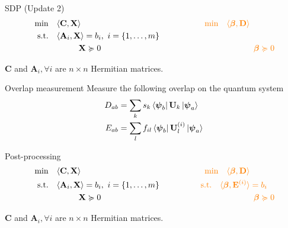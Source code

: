 \documentclass{beamer}
\newcommand{\betamat}{\boldsymbol\beta}
\newcommand{\psivec}{\boldsymbol\psi}
\newcommand{\Amat}{\mathbf{A}}
\newcommand{\Cmat}{\mathbf{C}}
\newcommand{\Dmat}{\mathbf{D}}
\newcommand{\Emat}{\mathbf{E}}
\newcommand{\Umat}{\mathbf{U}}
\newcommand{\Xmat}{\mathbf{X}}
\newcommand{\st}{\mathrm{s.t.}}
\begin{document}
	\begin{frame}{SDP (Update 2)}
		\begin{equation}
			\begin{aligned}
				& \min \quad \langle \Cmat, \Xmat \rangle \hspace{150pt} \textcolor{orange}{\min \quad \langle \betamat, \Dmat \rangle} \nonumber \\
				& \hspace{5pt} \st \quad \langle \Amat_i, \Xmat \rangle = b_i,\ i = \{1, \dots, m\} \nonumber \\
				& \hspace{55pt} \Xmat \succcurlyeq 0 \hspace{185pt} \textcolor{orange}{\betamat \succcurlyeq 0} \nonumber
			\end{aligned}
		\end{equation}
		\vfill
		\begin{center}
			$\Cmat$ and $\Amat_i, \forall i$ are $n \times n$ Hermitian matrices.
		\end{center}
	\end{frame}
	
	\begin{frame}{Overlap measurement}
		Measure the following overlap on the quantum system
		\begin{align*}
			D_{ab} &= \sum_k s_k \bra{\psivec_b} \Umat_k \ket{\psivec_a} \\
			E_{ab} &= \sum_l f_{il} \bra{\psivec_b} \Umat_l^{(i)} \ket{\psivec_a}
		\end{align*}
	\end{frame}
	
	\begin{frame}{Post-processing}
		\begin{equation}
			\begin{aligned}
				& \min \quad \langle \Cmat, \Xmat \rangle \hspace{150pt} \textcolor{orange}{\min \quad \langle \betamat, \Dmat \rangle} \nonumber \\
				& \hspace{5pt} \st \quad \langle \Amat_i, \Xmat \rangle = b_i,\ i = \{1, \dots, m\} \hspace{50pt}\textcolor{orange}{\st \quad \langle \betamat, \Emat^{(i)} \rangle = b_i} \nonumber \\
				& \hspace{55pt} \Xmat \succcurlyeq 0 \hspace{185pt} \textcolor{orange}{\betamat \succcurlyeq 0} \nonumber
			\end{aligned}
		\end{equation}
		\vfill
		\begin{center}
			$\Cmat$ and $\Amat_i, \forall i$ are $n \times n$ Hermitian matrices.
		\end{center}
	\end{frame}
\end{document}
